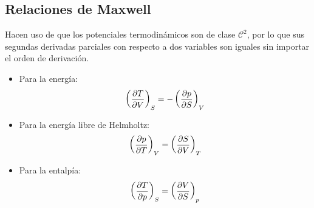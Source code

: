 \subsection{Relaciones de Maxwell} 
\label{relaciones-maxwell}
Hacen uso de que los potenciales termodinámicos son de clase $\mathcal{C}^2$, por lo que sus segundas derivadas parciales con respecto a dos variables son iguales sin importar el orden de derivación. 

\begin{itemize}
    \item Para la energía:
    \[\devtermo{S}{T}{V} = -\devtermo{V}{p}{S}\]
    \item Para la energía libre de Helmholtz:
    \[\devtermo{V}{p}{T} = \devtermo{T}{S}{V}\]
    \item Para la entalpía:
    \[ \devtermo{S}{T}{p} = \devtermo{p}{V}{S} \]
\end{itemize}

\newpage